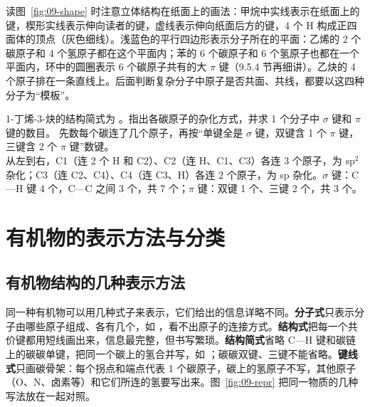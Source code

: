 读图~\ref{fig:09-shape} 时注意立体结构在纸面上的画法：甲烷中实线表示在纸面上的键，楔形实线表示伸向读者的键，虚线表示伸向纸面后方的键，4 个 H 构成正四面体的顶点（灰色细线）。浅蓝色的平行四边形表示分子所在的平面：乙烯的 2 个碳原子和 4 个氢原子都在这个平面内；苯的 6 个碳原子和 6 个氢原子也都在一个平面内，环中的圆圈表示 6 个碳原子共有的大 $\pi$ 键（9.5.4 节再细讲）。乙炔的 4 个原子排在一条直线上。后面判断复杂分子中原子是否共面、共线，都要以这四种分子为“模板”。

\begin{liti}[基础]
1-丁烯-3-炔的结构简式为 。指出各碳原子的杂化方式，并求 1 个分子中 $\sigma$ 键和 $\pi$ 键的数目。
\tcblower
\silu 先数每个碳连了几个原子，再按“单键全是 $\sigma$ 键，双键含 1 个 $\pi$ 键，三键含 2 个 $\pi$ 键”数键。\\
\jie 从左到右，C1（连 2 个 H 和 C2）、C2（连 H、C1、C3）各连 3 个原子，为 $\mathrm{sp}^2$ 杂化；C3（连 C2、C4）、C4（连 C3、H）各连 2 个原子，为 sp 杂化。$\sigma$ 键：C—H 键 4 个，C—C 之间 3 个，共 7 个；$\pi$ 键：双键 1 个、三键 2 个，共 3 个。
\end{liti}

\section{有机物的表示方法与分类}

\subsection{有机物结构的几种表示方法}
同一种有机物可以用几种式子来表示，它们给出的信息详略不同。\textbf{分子式}只表示分子由哪些原子组成、各有几个，如 ，看不出原子的连接方式。\textbf{结构式}把每一个共价键都用短线画出来，信息最完整，但书写繁琐。\textbf{结构简式}省略 C—H 键和碳链上的碳碳单键，把同一个碳上的氢合并写，如 ；碳碳双键、三键不能省略。\textbf{键线式}只画碳骨架：每个拐点和端点代表 1 个碳原子，碳上的氢原子不写，其他原子（O、N、卤素等）和它们所连的氢要写出来。图~\ref{fig:09-repr} 把同一物质的几种写法放在一起对照。


